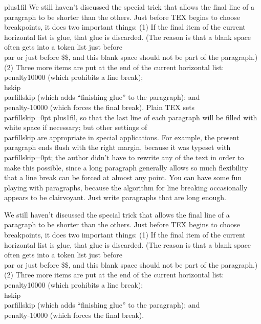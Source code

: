 \parfillskip=0pt plus1fil
We still haven’t discussed the special trick that allows the final line of a
paragraph to be shorter than the others.
Just before TEX begins to choose
breakpoints, it does two important things: (1) If the final item of the current horizontal
list is glue, that glue is discarded. 
(The reason is that a blank space often gets into a
token list just before \\par or just before \$\$, 
and this blank space should not be part
of the paragraph.) 
(2) Three more items are put at the end of the current horizontal
list: \\{penalty10000} (which prohibits a line break); \\{hskip\\parfillskip} (which adds
“finishing glue” to the paragraph);
and \\penalty-10000 (which forces the final break).
Plain TEX sets \\parfillskip=0pt plus1fil,
so that the last line of each paragraph will
be filled with white space if necessary;
but other settings of \\parfillskip are appropriate in special applications.
For example, the present paragraph ends flush with the
right margin, because it was typeset with \\parfillskip=0pt; the author didn’t have to
rewrite any of the text in order to make this possible, since a long paragraph generally
allows so much flexibility that a line break can be forced at almost any point. You
can have some fun playing with paragraphs, because the algorithm for line breaking
occasionally appears to be clairvoyant. Just write paragraphs that are long enough.\hfilneg\ \par
We still haven’t discussed the special trick that allows the final line of a
paragraph to be shorter than the others.
Just before TEX begins to choose
breakpoints, it does two important things: (1) If the final item of the current horizontal
list is glue, that glue is discarded. 
(The reason is that a blank space often gets into a
token list just before \\par or just before \$\$, 
and this blank space should not be part
of the paragraph.) 
(2) Three more items are put at the end of the current horizontal
list: \\{penalty10000} (which prohibits a line break); \\{hskip\\parfillskip} (which adds
“finishing glue” to the paragraph);
and \\penalty-10000 (which forces the final break).
